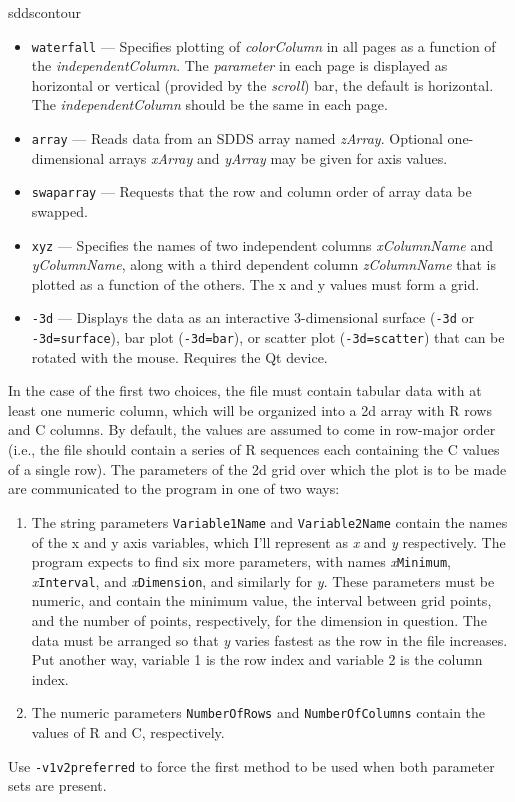 \begin{sddsprog}{sddscontour}
\begin{itemize}
\begin{itemize}
        color bar.
        \item \verb|waterfall| --- Specifies plotting of {\em colorColumn} in all pages as a function of the
        {\em independentColumn}. The {\em parameter} in each page is displayed as horizontal or vertical (provided
        by the {\em scroll}) bar, the default is horizontal. The {\em independentColumn} should be the same in
        each page.
        \item \verb|array| --- Reads data from an SDDS array named {\em zArray}.  Optional one-dimensional arrays
          {\em xArray} and {\em yArray} may be given for axis values.
        \item \verb|swaparray| --- Requests that the row and column order of array data be swapped.
        \item \verb|xyz| --- Specifies the names of two independent columns {\em xColumnName} and {\em yColumnName}, along with
          a third dependent column {\em zColumnName} that is plotted as a function of the others.
          The x and y values must form a grid.
        \item \verb|-3d| --- Displays the data as an interactive 3-dimensional surface (\verb|-3d| or \verb|-3d=surface|), bar plot (\verb|-3d=bar|), or scatter plot (\verb|-3d=scatter|) that can be rotated with the mouse. Requires the Qt device.
        \end{itemize}

        In the case of the first two choices, the file must contain
tabular data with at least one numeric column, which will be organized
into a 2d array with R rows and C columns.  By default, the values are
assumed to come in row-major order (i.e., the file should contain a
series of R sequences each containing the C values of a single row).
The parameters of the 2d grid over which the plot is to be made are
communicated to the program in one of two ways:

\begin{enumerate}

\item The string parameters \verb|Variable1Name| and \verb|Variable2Name| contain the names of the
x and y axis variables, which I'll represent as {\em x} and {\em y} respectively.  The program expects to find
six more parameters, with names {\em x}\verb|Minimum|, {\em x}\verb|Interval|, and {\em x}\verb|Dimension|,
and similarly for {\em y}.  These parameters must be numeric, and contain the minimum value, the interval
between grid points, and the number of points, respectively, for the dimension in question.
The data must be arranged so that {\em y} varies fastest as the row in the file increases.  Put another
way, variable 1 is the row index and variable 2 is the column index.
\item The numeric parameters \verb|NumberOfRows| and \verb|NumberOfColumns| contain the values of R and
C, respectively.
\end{enumerate}
Use \verb|-v1v2preferred| to force the first method to be used when both parameter sets are present.


\end{itemize}
\end{sddsprog}
